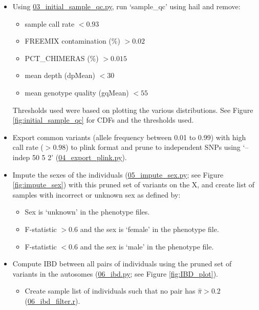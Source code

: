 \documentclass[12pt]{article}
\begin{document}
\begin{itemize}
\begin{itemize}
    \end{itemize}
    \item Using \href{https://github.com/astheeggeggs/BipEx/blob/master/scripts_BipEx/QC_BipEx/03_initial_sample_qc.py}{03\_initial\_sample\_qc.py}, run `sample\_qc' using hail and remove:
    \begin{itemize}
    	\item sample call rate $< 0.93$
    	\item FREEMIX contamination (\%) $> 0.02$
    	\item PCT\_CHIMERAS (\%) $>  0.015$
    	\item mean depth (dpMean) $< 30$
    	\item mean genotype quality (gqMean) $< 55$
    \end{itemize}
    Thresholds used were based on plotting the various distributions. See Figure \ref{fig:initial_sample_qc} for CDFs and the thresholds used.
    \item Export common variants (allele frequency between 0.01 to 0.99) with high call rate ($>0.98$) to plink format and prune to independent SNPs using `--indep 50 5 2' (\href{https://github.com/astheeggeggs/BipEx/blob/master/scripts_BipEx/QC_BipEx/04_export_plink.py}{04\_export\_plink.py}).
	\item Impute the sexes of the individuals (\href{https://github.com/astheeggeggs/BipEx/blob/master/scripts_BipEx/QC_BipEx/05_impute_sex.py}{05\_impute\_sex.py}; see Figure \ref{fig:impute_sex}) with this pruned set of variants on the X, and create list of samples with incorrect or unknown sex as defined by:
	\begin{itemize}
		\item Sex is `unknown' in the phenotype files.
		\item F-statistic $> 0.6$ and the sex is `female' in the phenotype file.
		\item F-statistic $< 0.6$ and the sex is `male' in the phenotype file.
	\end{itemize}
	\item Compute IBD between all pairs of individuals using the pruned set of variants in the autosomes (\href{https://github.com/astheeggeggs/BipEx/blob/master/scripts_BipEx/QC_BipEx/06_ibd.py}{06\_ibd.py}; see Figure \ref{fig:IBD_plot}).
		\begin{itemize}
			\item Create sample list of individuals such that no pair has $\hat{\pi}>0.2$ (\href{https://github.com/astheeggeggs/BipEx/blob/master/scripts_BipEx/QC_BipEx/06_ibd_filter.r}{06\_ibd\_filter.r}).

\end{itemize}
\end{itemize}
\end{document}
